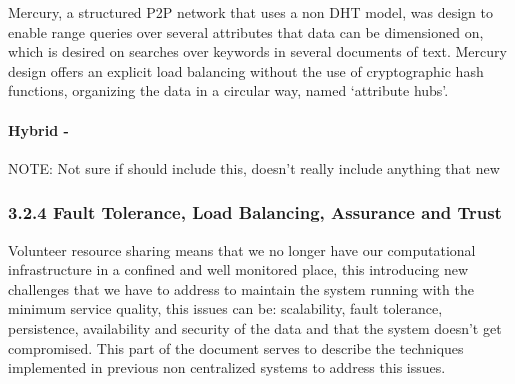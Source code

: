 \documentclass{./llncs2e/llncs}
\begin{document}
Mercury\cite{Bharambe}, a structured P2P network that uses a non DHT model, was design to enable range queries over several attributes that data can be dimensioned on, which is desired on searches over keywords in several documents of text. Mercury design offers an explicit load balancing without the use of cryptographic hash functions, organizing the data in a circular way, named `attribute hubs'.


\paragraph{\textbf{Hybrid -}} %
\label{par:Hybrid}

NOTE: Not sure if should include this, doesn't really include anything that new




\subsubsection{3.2.4 Fault Tolerance, Load Balancing, Assurance and Trust}

Volunteer resource sharing means that we no longer have our computational infrastructure in a confined and well monitored place, this introducing new challenges that we have to address \cite{Koloniari2005} to maintain the system running with the minimum service quality, this issues can be: scalability, fault tolerance, persistence, availability and security\cite{Wallach} of the data and that the system doesn't get compromised. This part of the document serves to describe the techniques implemented in previous non centralized systems to address this issues.
\end{document}

